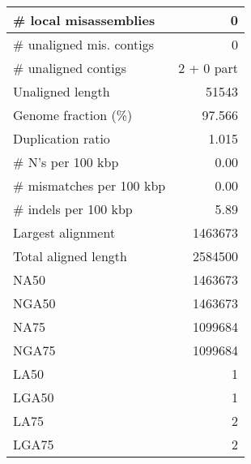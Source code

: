 \documentclass[12pt,a4paper]{article}
\begin{document}
\begin{table}[ht]
\begin{center}
\begin{tabular}{|l*{1}{|r}|}
\# local misassemblies & 0 \\ \hline
\# unaligned mis. contigs & 0 \\ \hline
\# unaligned contigs & 2 + 0 part \\ \hline
Unaligned length & 51543 \\ \hline
Genome fraction (\%) & 97.566 \\ \hline
Duplication ratio & 1.015 \\ \hline
\# N's per 100 kbp & 0.00 \\ \hline
\# mismatches per 100 kbp & 0.00 \\ \hline
\# indels per 100 kbp & 5.89 \\ \hline
Largest alignment & 1463673 \\ \hline
Total aligned length & 2584500 \\ \hline
NA50 & 1463673 \\ \hline
NGA50 & 1463673 \\ \hline
NA75 & 1099684 \\ \hline
NGA75 & 1099684 \\ \hline
LA50 & 1 \\ \hline
LGA50 & 1 \\ \hline
LA75 & 2 \\ \hline
LGA75 & 2 \\ \hline
\end{tabular}
\end{center}
\end{table}
\end{document}
